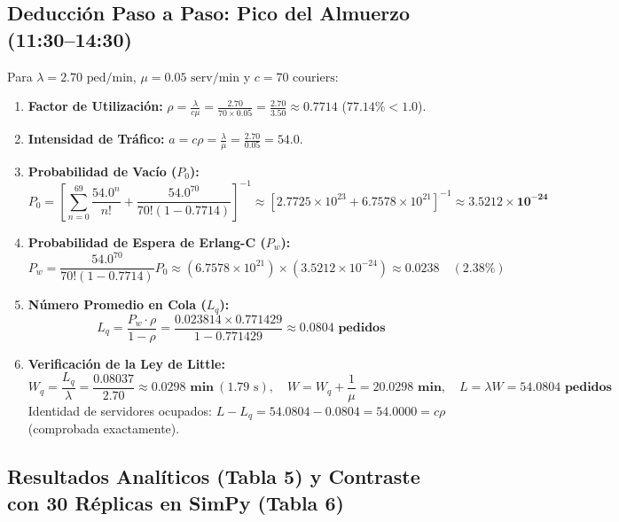 \documentclass[11pt,letterpaper]{article}
\begin{document}
\subsection{Deducción Paso a Paso: Pico del Almuerzo (11:30–14:30)}
Para $\lambda = 2.70\text{ ped/min}$, $\mu = 0.05\text{ serv/min}$ y $c = 70\text{ couriers}$:
\begin{enumerate}[leftmargin=1.5em, itemsep=0.2em]
    \item \textbf{Factor de Utilización:} $\rho = \frac{\lambda}{c\mu} = \frac{2.70}{70 \times 0.05} = \frac{2.70}{3.50} \approx \mathbf{0.7714}$ ($77.14\% < 1.0$).
    \item \textbf{Intensidad de Tráfico:} $a = c\rho = \frac{\lambda}{\mu} = \frac{2.70}{0.05} = 54.0$.
    \item \textbf{Probabilidad de Vacío ($P_0$):}
    \begin{equation}
        P_0 = \left[ \sum_{n=0}^{69} \frac{54.0^n}{n!} + \frac{54.0^{70}}{70!(1-0.7714)} \right]^{-1} \approx \left[ 2.7725 \times 10^{23} + 6.7578 \times 10^{21} \right]^{-1} \approx \mathbf{3.5212 \times 10^{-24}}
    \end{equation}
    \item \textbf{Probabilidad de Espera de Erlang-C ($P_w$):}
    \begin{equation}
        P_w = \frac{54.0^{70}}{70!(1-0.7714)} P_0 \approx (6.7578 \times 10^{21}) \times (3.5212 \times 10^{-24}) \approx \mathbf{0.0238} \quad (2.38\%)
    \end{equation}
    \item \textbf{Número Promedio en Cola ($L_q$):}
    \begin{equation}
        L_q = \frac{P_w \cdot \rho}{1 - \rho} = \frac{0.023814 \times 0.771429}{1 - 0.771429} \approx \mathbf{0.0804\text{ pedidos}}
    \end{equation}
    \item \textbf{Verificación de la Ley de Little:}
    \begin{equation}
        W_q = \frac{L_q}{\lambda} = \frac{0.08037}{2.70} \approx \mathbf{0.0298\text{ min}} \ (1.79\text{ s}), \quad W = W_q + \frac{1}{\mu} = \mathbf{20.0298\text{ min}}, \quad L = \lambda W = \mathbf{54.0804\text{ pedidos}}
    \end{equation}
    Identidad de servidores ocupados: $L - L_q = 54.0804 - 0.0804 = 54.0000 = c\rho$ (comprobada exactamente).
\end{enumerate}

\subsection{Resultados Analíticos (Tabla 5) y Contraste con 30 Réplicas en SimPy (Tabla 6)}
\end{document}

